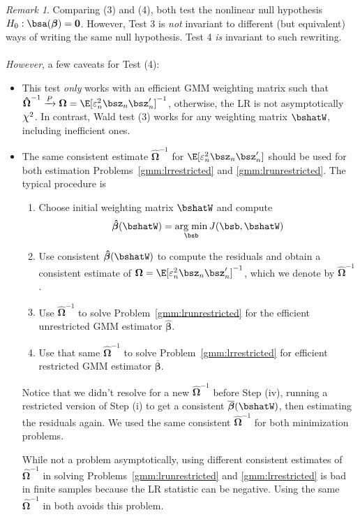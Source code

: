 \documentclass[12pt]{article}
\theoremstyle{plain}
\theoremstyle{definition}
\theoremstyle{remark}
\newtheorem*{rmk}{Remark}
\newcommand*{\Chi}{\mbox{\large$\chi$}} %
\newcommand{\bsbeta}{\boldsymbol{\beta}}
\newcommand{\bsOmega}{\boldsymbol{\Omega}}
\newcommand{\bshatbeta}{\boldsymbol{\hat{\beta}}}
\newcommand{\bsbarbeta}{\boldsymbol{\overline{\beta}}}
\newcommand{\bshatOmega}{\boldsymbol{\hat{\Omega}}}
\renewcommand{\bso}{\boldsymbol{0}}
\DeclareMathOperator*{\argmin}{arg\;min}
\newcommand{\pto}{\xrightarrow{P}}
\begin{document}
\begin{rmk}
Comparing (3) and (4), both test the nonlinear null hypothesis
$H_0:\bsa(\bsbeta)=\bso$. However, Test 3 is \emph{not} invariant to
different (but equivalent) ways of writing the same null hypothesis.
Test 4 \emph{is} invariant to such rewriting.
\\
\\
\emph{However}, a few caveats for Test (4):
\begin{itemize}
  \item This test \emph{only} works with an efficient GMM weighting
    matrix such that
    $\bshatOmega^{-1}\pto \bsOmega=\E[\varepsilon_n^2\bsz_n\bsz_n']^{-1}$, otherwise,
    the LR is not asymptotically $\Chi^2$. In contrast, Wald test (3)
    works for any weighting matrix $\bshatW$, including inefficient
    ones.

  \item The same consistent estimate $\bshatOmega^{-1}$ for
    $\E[\varepsilon_n^2\bsz_n\bsz_n']$ should be used for both
    estimation Problems~\ref{gmm:lrrestricted} and
    \ref{gmm:lrunrestricted}. The typical procedure is
    \begin{enumerate}[label=(\roman*)]
      \item
        Choose initial weighting matrix $\bshatW$ and compute
        \begin{align*}
          \bshatbeta(\bshatW) = \argmin_{\bsb} J(\bsb,\bshatW)
        \end{align*}

      \item Use consistent $\bshatbeta(\bshatW)$ to compute the
        residuals and obtain a consistent estimate of
        $\bsOmega=\E[\varepsilon_n^2\bsz_n\bsz_n']^{-1}$, which we denote by
        $\bshatOmega^{-1}$.

      \item Use $\bshatOmega^{-1}$ to solve
        Problem~\ref{gmm:lrunrestricted} for the efficient unrestricted
        GMM estimator $\bshatbeta$.

      \item Use that same $\bshatOmega^{-1}$ to solve
        Problem~\ref{gmm:lrrestricted} for efficient restricted
        GMM estimator $\bsbarbeta$.
    \end{enumerate}
    Notice that we didn't resolve for a new $\bshatOmega^{-1}$ before Step
    (iv), running a restricted version of Step (i) to get a consistent
    $\bsbarbeta(\bshatW)$, then estimating the residuals again. We used
    the same consistent $\bshatOmega^{-1}$ for both minimization problems.

    While not a problem asymptotically, using different consistent
    estimates of $\bshatOmega^{-1}$ in solving
    Problems~\ref{gmm:lrunrestricted} and \ref{gmm:lrrestricted} is bad
    in finite samples because the LR statistic can be negative. Using
    the same $\bshatOmega^{-1}$ in both avoids this problem.
\end{itemize}
\end{rmk}
\end{document}
